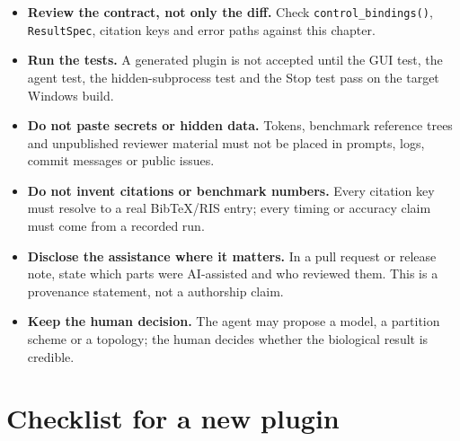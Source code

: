 \documentclass[10pt]{report}
\begin{document}
\begin{itemize}
  \item \textbf{Review the contract, not only the diff.} Check
        \texttt{control\_bindings()}, \texttt{ResultSpec}, citation keys and
        error paths against this chapter.
  \item \textbf{Run the tests.} A generated plugin is not accepted until the
        GUI test, the agent test, the hidden-subprocess test and the Stop test
        pass on the target Windows build.
  \item \textbf{Do not paste secrets or hidden data.} Tokens, benchmark
        reference trees and unpublished reviewer material must not be placed
        in prompts, logs, commit messages or public issues.
  \item \textbf{Do not invent citations or benchmark numbers.} Every citation
        key must resolve to a real BibTeX/RIS entry; every timing or accuracy
        claim must come from a recorded run.
  \item \textbf{Disclose the assistance where it matters.} In a pull request
        or release note, state which parts were AI-assisted and who reviewed
        them. This is a provenance statement, not a authorship claim.
  \item \textbf{Keep the human decision.} The agent may propose a model, a
        partition scheme or a topology; the human decides whether the
        biological result is credible.
\end{itemize}

\section{Checklist for a new plugin}
\end{document}
